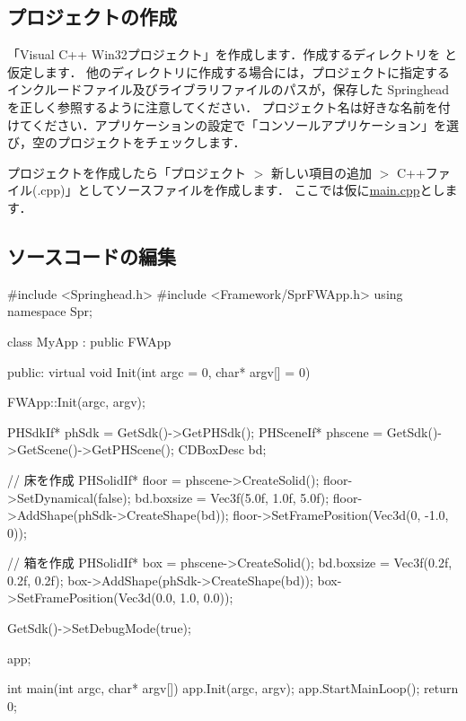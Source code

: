 \subsection*{\KLUDGE プロジェクトの作成}

\KLUDGE 「Visual C++ Win32\KLUDGE プロジェクト」を作成します．作成するディレクトリを  \KLUDGE と仮定します． \KLUDGE 他のディレクトリに作成する場合には，プロジェクトに指定するインクルードファイル及びライブラリファイルのパスが，保存した Springhead \KLUDGE を正しく参照するように注意してください． \KLUDGE プロジェクト名は好きな名前を付けてください．アプリケーションの設定で「コンソールアプリケーション」を選び，空のプロジェクトをチェックします．

\KLUDGE プロジェクトを作成したら「プロジェクト $>$ \KLUDGE 新しい項目の追加 $>$ C++\KLUDGE ファイル(.cpp)\KLUDGE 」としてソースファイルを作成します．
\KLUDGE ここでは仮に\url{main.cpp}\KLUDGE とします．

\subsection*{\KLUDGE ソースコードの編集}

\begin{table}[t]
\caption{Simplest program code}
\label{table_simplest_code}
{\small
\begin{sourcecode}
#include <Springhead.h>
#include <Framework/SprFWApp.h>
using namespace Spr;

class MyApp : public FWApp{
public:
    virtual void Init(int argc = 0, char* argv[] = 0){
        FWApp::Init(argc, argv);

        PHSdkIf* phSdk = GetSdk()->GetPHSdk();
        PHSceneIf* phscene = GetSdk()->GetScene()->GetPHScene();
        CDBoxDesc bd;
        
        // 床を作成
        PHSolidIf* floor = phscene->CreateSolid();
        floor->SetDynamical(false);
        bd.boxsize = Vec3f(5.0f, 1.0f, 5.0f);
        floor->AddShape(phSdk->CreateShape(bd));
        floor->SetFramePosition(Vec3d(0, -1.0, 0));
    
        // 箱を作成
        PHSolidIf* box = phscene->CreateSolid();
        bd.boxsize = Vec3f(0.2f, 0.2f, 0.2f);
        box->AddShape(phSdk->CreateShape(bd));
        box->SetFramePosition(Vec3d(0.0, 1.0, 0.0));

        GetSdk()->SetDebugMode(true);
    }
} app;

int main(int argc, char* argv[]){
    app.Init(argc, argv);
    app.StartMainLoop();
    return 0;
}
\end{sourcecode}
}
\end{table}

